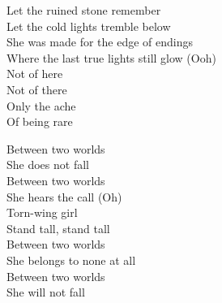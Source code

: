\begin{lyrics}
Let the ruined stone remember\\
Let the cold lights tremble below\\
She was made for the edge of endings\\
Where the last true lights still glow
(Ooh)\\
Not of here\\
Not of there\\
Only the ache\\
Of being rare

Between two worlds\\
She does not fall\\
Between two worlds\\
She hears the call
(Oh)\\
Torn-wing girl\\
Stand tall, stand tall\\
Between two worlds\\
She belongs to none at all\\
Between two worlds\\
She will not fall
\end{lyrics}

